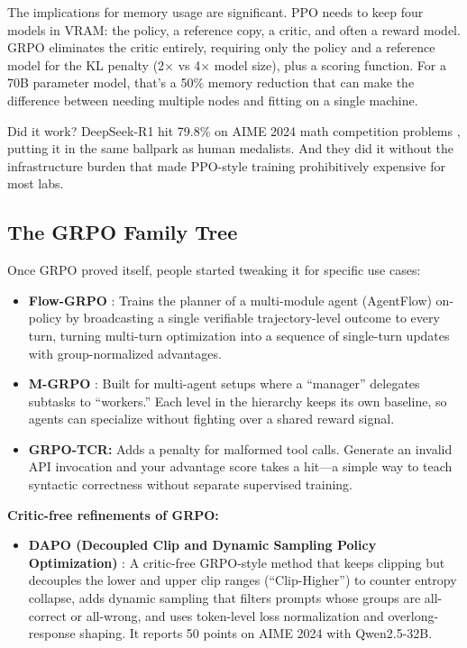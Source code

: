 \documentclass[12pt,a4paper]{report}
\theoremstyle{definition}
\begin{document}
The implications for memory usage are significant. PPO needs to keep four models in VRAM: the policy, a reference copy, a critic, and often a reward model. GRPO eliminates the critic entirely, requiring only the policy and a reference model for the KL penalty (2$\times$ vs 4$\times$ model size), plus a scoring function. For a 70B parameter model, that's a 50\% memory reduction that can make the difference between needing multiple nodes and fitting on a single machine.

Did it work? DeepSeek-R1 hit 79.8\% on AIME 2024 math competition problems \cite{deepseek2025r1}, putting it in the same ballpark as human medalists. And they did it without the infrastructure burden that made PPO-style training prohibitively expensive for most labs.

\subsection{The GRPO Family Tree}
Once GRPO proved itself, people started tweaking it for specific use cases:

\begin{itemize}
    \item \textbf{Flow-GRPO} \cite{li2025flowgrpo}: Trains the planner of a multi-module agent (AgentFlow) on-policy by broadcasting a single verifiable trajectory-level outcome to every turn, turning multi-turn optimization into a sequence of single-turn updates with group-normalized advantages.

    \item \textbf{M-GRPO} \cite{hong2025mgrpo}: Built for multi-agent setups where a ``manager'' delegates subtasks to ``workers.'' Each level in the hierarchy keeps its own baseline, so agents can specialize without fighting over a shared reward signal.

    \item \textbf{GRPO-TCR:} Adds a penalty for malformed tool calls. Generate an invalid API invocation and your advantage score takes a hit---a simple way to teach syntactic correctness without separate supervised training.

\end{itemize}

\noindent\textbf{Critic-free refinements of GRPO:}
\begin{itemize}
    \item \textbf{DAPO (Decoupled Clip and Dynamic Sampling Policy Optimization)} \cite{bytedance2025dapo}: A critic-free GRPO-style method that keeps clipping but decouples the lower and upper clip ranges (``Clip-Higher'') to counter entropy collapse, adds dynamic sampling that filters prompts whose groups are all-correct or all-wrong, and uses token-level loss normalization and overlong-response shaping. It reports 50 points on AIME 2024 with Qwen2.5-32B.
\end{itemize}
\end{document}
